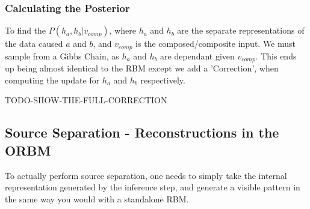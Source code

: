 \begin{itemize}
\begin{itemize}
    \end{itemize}


    \subsubsection{Calculating the Posterior}

    To find the $ P(h_a, h_b | v_{comp}) $, where $h_a$ and $h_b$ are the separate representations of the data caused $a$ and $b$, and $v_{comp}$ is the composed/composite input. We must sample from a Gibbs Chain,  as $h_a$ and $h_b$ are dependant given $v_{comp}$. This ends up being almost identical to the RBM except we add a 'Correction', when computing the update for $h_a$ and $h_b$ respectively.

    TODO-SHOW-THE-FULL-CORRECTION

    \subsection{Source Separation - Reconstructions in the ORBM}

    To actually perform source separation, one needs to simply take the internal representation generated by the inference step, and generate a visible pattern in the same way you would with a standalone RBM.
